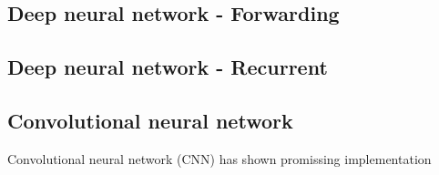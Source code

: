 \subsection{Deep neural network - Forwarding}
\subsection{Deep neural network - Recurrent}
\subsection{Convolutional neural network}
Convolutional neural network (CNN) has shown promissing implementation